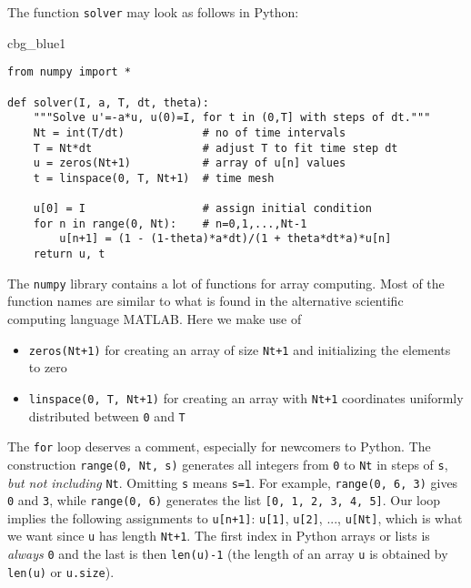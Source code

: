 \documentclass[graybox,sectrefs,envcountresetchap,open=right,final]{svmonodo}
\newenvironment{_cod_tight}[1]{
   \def\FrameCommand{\colorbox{#1}}
   \FrameRule0.6pt\MakeFramed {\FrameRestore}\vskip3mm}
   {\vskip0mm\endMakeFramed}
\newenvironment{cod}[1]{
\bgroup\rmfamily
\fboxsep=0mm\relax
\begin{_cod_tight}{#1}
\list{}{\parsep=-2mm\parskip=0mm\topsep=0pt\leftmargin=2mm
\rightmargin=2\leftmargin\leftmargin=4pt\relax}
\item\relax}
{\endlist\end{_cod_tight}\egroup}
\begin{document}
The function \texttt{solver} may look as follows in Python:

\begin{cod}{cbg_blue1}\begin{Verbatim}[numbers=none,fontsize=\fontsize{9pt}{9pt},baselinestretch=0.95,xleftmargin=2mm]
from numpy import *

def solver(I, a, T, dt, theta):
    """Solve u'=-a*u, u(0)=I, for t in (0,T] with steps of dt."""
    Nt = int(T/dt)            # no of time intervals
    T = Nt*dt                 # adjust T to fit time step dt
    u = zeros(Nt+1)           # array of u[n] values
    t = linspace(0, T, Nt+1)  # time mesh

    u[0] = I                  # assign initial condition
    for n in range(0, Nt):    # n=0,1,...,Nt-1
        u[n+1] = (1 - (1-theta)*a*dt)/(1 + theta*dt*a)*u[n]
    return u, t
\end{Verbatim}
\end{cod}
\noindent

The \texttt{numpy} library contains a lot of functions for array computing. Most
of the function names are similar to what is found
in the alternative scientific computing language MATLAB. Here
we make use of

\begin{itemize}
 \item \texttt{zeros(Nt+1)} for creating an array of size \texttt{Nt+1}
   and initializing the elements to zero

 \item \texttt{linspace(0, T, Nt+1)} for creating an array with \texttt{Nt+1}
   coordinates uniformly distributed between \texttt{0} and \texttt{T}
\end{itemize}

\noindent
The \texttt{for} loop deserves a comment, especially for newcomers to Python.
The construction \texttt{range(0, Nt, s)} generates all integers from \texttt{0} to \texttt{Nt}
in steps of \texttt{s}, \emph{but not including} \texttt{Nt}. Omitting \texttt{s} means \texttt{s=1}.
For example, \texttt{range(0, 6, 3)}
gives \texttt{0} and \texttt{3}, while \texttt{range(0, 6)} generates
the list \texttt{[0, 1, 2, 3, 4, 5]}.
Our loop implies the following assignments to \texttt{u[n+1]}: \texttt{u[1]}, \texttt{u[2]}, ...,
\texttt{u[Nt]}, which is what we want since \texttt{u} has length \texttt{Nt+1}.
The first index in Python arrays or lists is \emph{always} \texttt{0} and the
last is then \texttt{len(u)-1} (the length of an array \texttt{u} is obtained by
\texttt{len(u)} or \texttt{u.size}).
\end{document}
